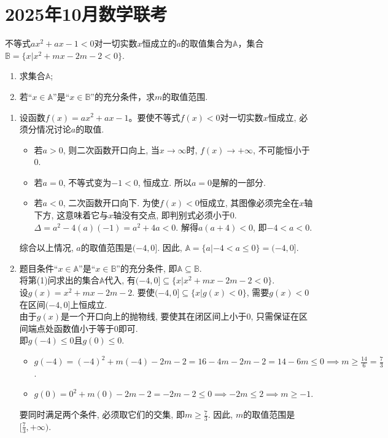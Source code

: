 \documentclass[CJKmath,a4paper,10pt]{ctexart}
\begin{document}
\section{2025年10月数学联考}

\begin{liti}
不等式$ax^2+ax-1<0$对一切实数$x$恒成立的$a$的取值集合为$\mathbb{A}$，集合$\mathbb{B}=\{x|x^2+mx-2m-2<0\}$.
\begin{enumerate}
\item 求集合$\mathbb{A}$;
\item 若“$x\in\mathbb{A}$”是“$x\in\mathbb{B}$”的充分条件，求$m$的取值范围.
\end{enumerate}

\tcblower
\begin{enumerate}
\item 设函数$f(x)=ax^2+ax-1$。要使不等式$f(x)<0$对一切实数$x$恒成立, 必须分情况讨论$a$的取值.
\begin{itemize}
    \item 若$a>0$, 则二次函数开口向上, 当$x\to\infty$时, $f(x)\to+\infty$, 不可能恒小于0.
    \item 若$a=0$, 不等式变为$-1<0$, 恒成立. 所以$a=0$是解的一部分.
    \item 若$a<0$, 二次函数开口向下. 为使$f(x)<0$恒成立, 其图像必须完全在$x$轴下方, 这意味着它与$x$轴没有交点, 即判别式必须小于0.
    $\Delta = a^2 - 4(a)(-1) = a^2+4a < 0$.
    解得$a(a+4)<0$, 即$-4 < a < 0$.
\end{itemize}
综合以上情况, $a$的取值范围是$(-4, 0]$. 因此, $\mathbb{A}=\{a|-4<a\le 0\}=(-4,0]$.

\item 题目条件“$x\in\mathbb{A}$”是“$x\in\mathbb{B}$”的充分条件, 即$\mathbb{A}\subseteq\mathbb{B}$.\\
将第(1)问求出的集合$\mathbb{A}$代入, 有$(-4,0]\subseteq\{x|x^2+mx-2m-2<0\}$.\\
设$g(x)=x^2+mx-2m-2$. 要使$(-4,0]\subseteq\{x|g(x)<0\}$, 需要$g(x)<0$在区间$(-4,0]$上恒成立.\\
由于$g(x)$是一个开口向上的抛物线, 要使其在闭区间上小于0, 只需保证在区间端点处函数值小于等于0即可.\\
即$g(-4)\le 0$且$g(0)\le 0$.
\begin{itemize}
    \item $g(-4) = (-4)^2 + m(-4) - 2m - 2 = 16 - 4m - 2m - 2 = 14 - 6m \le 0 \implies m \ge \frac{14}{6} = \frac{7}{3}$.
    \item $g(0) = 0^2 + m(0) - 2m - 2 = -2m - 2 \le 0 \implies -2m \le 2 \implies m \ge -1$.
\end{itemize}
要同时满足两个条件, 必须取它们的交集, 即$m\ge\frac{7}{3}$.
因此, $m$的取值范围是$[\frac{7}{3}, +\infty)$.
\end{enumerate}
\end{liti}
\end{document}
